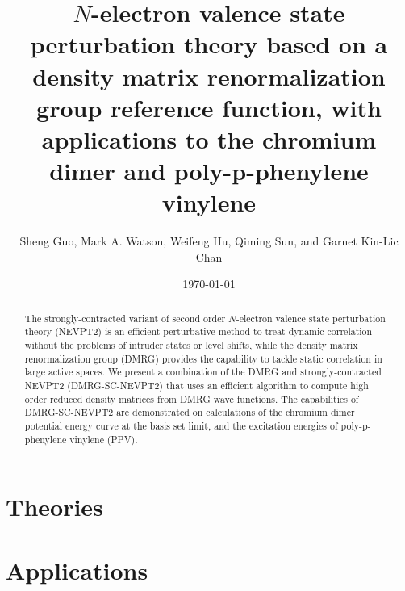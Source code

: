 \documentclass[
 aip,
 jcp,
 numerical,
 reprint, %
]{revtex4-1}
\begin{document}
\title{$N$-electron valence state perturbation theory based on a density matrix renormalization group reference function, with applications to the chromium dimer and 
poly-p-phenylene vinylene}
\author{Sheng Guo, Mark A. Watson, Weifeng Hu, Qiming Sun, and Garnet Kin-Lic Chan}

\begin{abstract}

The strongly-contracted variant of second order $N$-electron valence state perturbation theory (NEVPT2) is an efficient perturbative method to 
treat dynamic correlation without the problems of intruder states or level shifts, while the density matrix renormalization group (DMRG) 
provides the capability to tackle static correlation in large active spaces. 
We present a combination of the DMRG and strongly-contracted NEVPT2 (DMRG-SC-NEVPT2) that uses an efficient algorithm to compute high order 
reduced density matrices from DMRG wave functions. The capabilities of DMRG-SC-NEVPT2 are demonstrated on calculations of the chromium dimer 
potential energy curve at the basis set limit, and the excitation energies of poly-p-phenylene vinylene (PPV).

\end{abstract}

\date{\today}

\maketitle



\section{Theories}







\section{Applications}










{}
\end{document}
